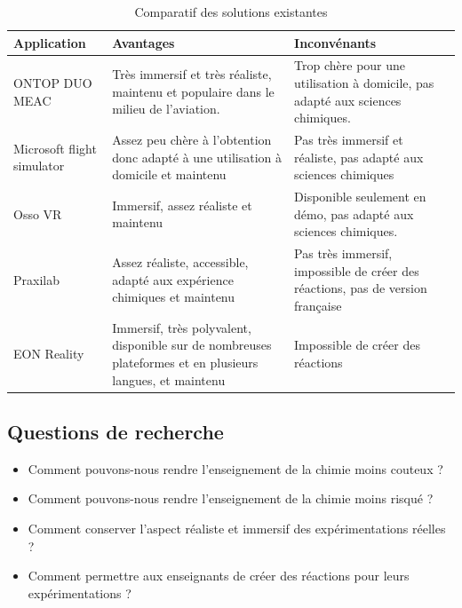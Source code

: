\begin{table}[H]
	\centering
	\caption{Comparatif des solutions existantes}
	\begin{tabular}{|l|p{5cm}|p{5cm}|}
		\hline
		\textbf{Application}       & \textbf{Avantages}                                                                                      & \textbf{Inconvénants}                                                          \\ \hline
		ONTOP DUO MEAC             & Très immersif et très réaliste, maintenu et populaire dans le milieu de l'aviation.                          & Trop chère pour une utilisation à domicile, pas adapté aux sciences chimiques. \\ \hline
		Microsoft flight simulator & Assez peu chère à l'obtention donc adapté à une utilisation à domicile et maintenu                      & Pas très immersif et réaliste, pas adapté aux sciences chimiques                \\ \hline
		Osso VR                    & Immersif, assez réaliste et maintenu                                                                    & Disponible seulement en démo, pas adapté aux sciences chimiques.                \\ \hline
		Praxilab                   & Assez réaliste, accessible, adapté aux expérience chimiques et maintenu                                   & Pas très immersif, impossible de créer des réactions, pas de version française \\ \hline
		EON Reality                & Immersif, très polyvalent, disponible sur de nombreuses plateformes et en plusieurs langues, et maintenu & Impossible de créer des réactions                                              \\ \hline
	\end{tabular}
\end{table}

\subsection{Questions de recherche}

\begin{itemize}
	\item Comment pouvons-nous rendre l'enseignement de la chimie moins couteux ?
	\item Comment pouvons-nous rendre l'enseignement de la chimie moins risqué ?
	\item Comment conserver l'aspect réaliste et immersif des expérimentations réelles ?
	\item Comment permettre aux enseignants de créer des réactions pour leurs expérimentations ?
\end{itemize}

